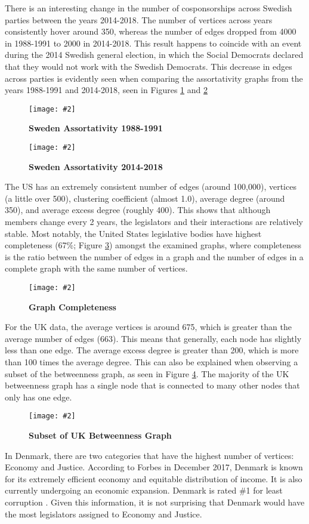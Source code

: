 \documentclass[12pt]{article}
\newcommand{\image}[4][0.6]{
  \begin{figure}[H]
    \centering
    \texttt{[image: \#2]}
    \begin{center}
      \caption[(details)]{\textbf{#4}\label{fig:#3}}
    \end{center}
    \vspace{-2.5em}
  \end{figure}}
\begin{document}
\begin{multicols*}{2}
There is an interesting change in the number of cosponsorships across Swedish parties between the years 2014-2018. The number of vertices across years consistently hover around 350, whereas the number of edges dropped from 4000 in 1988-1991 to 2000 in 2014-2018. This result happens to coincide with an event during the 2014 Swedish general election, in which the Social Democrats declared that they would not work with the Swedish Democrats. This decrease in edges across parties is evidently seen when comparing the assortativity graphs from the years 1988-1991 and 2014-2018, seen in Figures \ref{fig:swe_ass_1988} and \ref{fig:swe_ass_2014}

\image[0.3]{../plots/graph/sweden/assortativity/assortativity_net_se1988-1991.pdf}{swe_ass_1988}{Sweden Assortativity 1988-1991}
\image[0.3]{../plots/graph/sweden/assortativity/assortativity_net_se2014-2018.pdf}{swe_ass_2014}{Sweden Assortativity 2014-2018}

The US has an extremely consistent number of edges (around 100,000), vertices (a little over 500), clustering coefficient (almost 1.0), average degree (around 350), and average excess degree (roughly 400). This shows that although members change every 2 years, the legislators and their interactions are relatively stable. Most notably, the United States legislative bodies have highest completeness (67\%; Figure \ref{fig:completeness}) amongst the examined graphs, where completeness is the ratio between the number of edges in a graph and the number of edges in a complete graph with the same number of vertices.

\image[0.3]{../plots/averages/completeness.pdf}{completeness}{Graph Completeness}

For the UK data, the average vertices is around 675, which is greater than the average number of edges (663). This means that generally, each node has slightly less than one edge. The average excess degree is greater than 200, which is more than 100 times the average degree. This can also be explained when observing a subset of the betweenness graph, as seen in Figure \ref{fig:uk-betweenness}. The majority of the UK betweenness graph has a single node that is connected to many other nodes that only has one edge. 

\begin{center}
  \image[0.2]{Images/uk-betweenness.png}{uk-betweenness}{Subset of UK Betweenness Graph}
\end{center}

In Denmark, there are two categories that have the highest number of vertices: Economy and Justice. According to Forbes in December 2017, Denmark is known for its extremely efficient economy and equitable distribution of income. It is also currently undergoing an economic expansion. Denmark is rated \#1 for least corruption \cite{denmark}. Given this information, it is not surprising that Denmark would have the most legislators assigned to Economy and Justice.


\end{multicols*}
\end{document}
